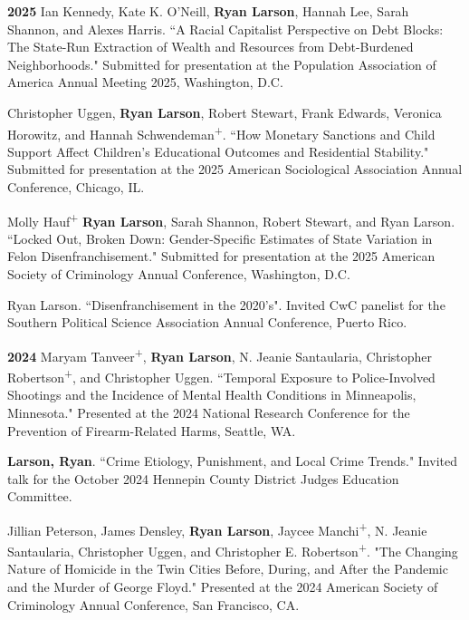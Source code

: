 \documentclass[letterpaper]{article}
\newenvironment{publist}{%
  \begin{list}{}{%
    \setlength{\leftmargin}{0cm}   %
    \setlength{\labelwidth}{2cm}     %
    \setlength{\labelsep}{0.5cm}     %
  }%
}{%
  \end{list}%
}
\begin{document}
\begin{publist}

\item [\textbf{2025}] Ian Kennedy, Kate K. O'Neill, \textbf{Ryan Larson}, Hannah Lee, Sarah Shannon, and Alexes Harris. ``A Racial Capitalist Perspective on Debt Blocks: The State-Run Extraction of Wealth and Resources from Debt-Burdened Neighborhoods." Submitted for presentation at the Population Association of America Annual Meeting 2025, Washington, D.C. 

\item Christopher Uggen, \textbf{Ryan Larson}, Robert Stewart, Frank Edwards, Veronica Horowitz, and Hannah Schwendeman\textsuperscript{+}. ``How Monetary Sanctions and Child Support Affect Children's Educational Outcomes and Residential Stability." Submitted for presentation at the 2025 American Sociological Association Annual Conference, Chicago, IL. 

\item Molly Hauf\textsuperscript{+} \textbf{Ryan Larson}, Sarah Shannon, Robert Stewart, and Ryan Larson. ``Locked Out, Broken Down: Gender-Specific Estimates of State Variation in Felon Disenfranchisement." Submitted for presentation at the 2025 American Society of Criminology Annual Conference, Washington, D.C. 

\item Ryan Larson. ``Disenfranchisement in the 2020's". Invited CwC panelist for the Southern Political Science Association Annual Conference, Puerto Rico. 

\item[\textbf{2024}] Maryam Tanveer\textsuperscript{+}, \textbf{Ryan Larson}, N. Jeanie Santaularia, Christopher Robertson\textsuperscript{+}, and Christopher Uggen. ``Temporal Exposure to Police-Involved Shootings and the Incidence of Mental Health Conditions in Minneapolis, Minnesota." Presented at the 2024 National Research Conference for the Prevention of Firearm-Related Harms, Seattle, WA. 

\item \textbf{Larson, Ryan}. ``Crime Etiology, Punishment, and Local Crime Trends." Invited talk for the October 2024 Hennepin County District Judges Education Committee.  

\item Jillian Peterson, James Densley, \textbf{Ryan Larson}, Jaycee Manchi\textsuperscript{+}, N. Jeanie Santaularia, Christopher Uggen, and Christopher E. Robertson\textsuperscript{+}. "The Changing Nature of Homicide in the Twin Cities Before, During, and After the Pandemic and the Murder of George Floyd." Presented at the 2024 American Society of Criminology Annual Conference, San Francisco, CA. 


\end{publist}
\end{document}
